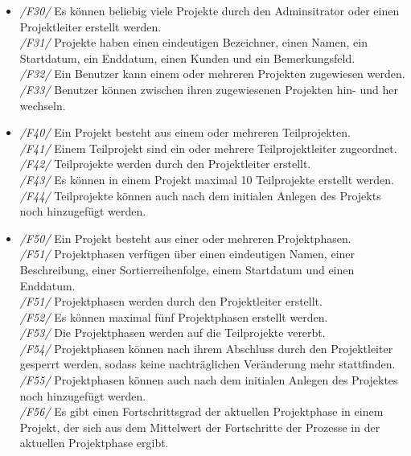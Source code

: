 \begin{itemize}
    \item[] \emph{/F30/} Es können beliebig viele Projekte durch den Adminsitrator oder einen Projektleiter erstellt werden.
    \\\emph{/F31/} Projekte haben einen eindeutigen Bezeichner, einen Namen, ein Startdatum, ein Enddatum, einen Kunden und ein Bemerkungsfeld.
    \\\emph{/F32/} Ein Benutzer kann einem oder mehreren Projekten zugewiesen werden.
    \\\emph{/F33/} Benutzer können zwischen ihren zugewiesenen Projekten hin- und her wechseln. 
    \vspace{0.5cm}

    \item[] \emph{/F40/} Ein Projekt besteht aus einem oder mehreren Teilprojekten.
    \\\emph{/F41/} Einem Teilprojekt sind ein oder mehrere Teilprojektleiter zugeordnet.
    \\\emph{/F42/} Teilprojekte werden durch den Projektleiter erstellt.
    \\\emph{/F43/} Es können in einem Projekt maximal 10 Teilprojekte erstellt werden.
    \\\emph{/F44/} Teilprojekte können auch nach dem initialen Anlegen des Projekts noch hinzugefügt werden.
    \vspace{0.5cm}  

    \item[] \emph{/F50/} Ein Projekt besteht aus einer oder mehreren Projektphasen.
    \\\emph{/F51/} Projektphasen verfügen über einen eindeutigen Namen, einer Beschreibung, einer Sortierreihenfolge, einem Startdatum und einen Enddatum.
    \\\emph{/F51/} Projektphasen werden durch den Projektleiter erstellt.
    \\\emph{/F52/} Es können maximal fünf Projektphasen erstellt werden.
    \\\emph{/F53/} Die Projektphasen werden auf die Teilprojekte vererbt.
    \\\emph{/F54/} Projektphasen können nach ihrem Abschluss durch den Projektleiter gesperrt werden, sodass keine nachträglichen Veränderung mehr stattfinden. 
    \\\emph{/F55/} Projektphasen können auch nach dem initialen Anlegen des Projektes noch hinzugefügt 
    werden.
    \\\emph{/F56/} Es gibt einen Fortschrittsgrad der aktuellen Projektphase in einem Projekt, der sich aus dem Mittelwert der Fortschritte der Prozesse in der aktuellen Projektphase ergibt.
    \vspace{0.5cm} 


\end{itemize}
